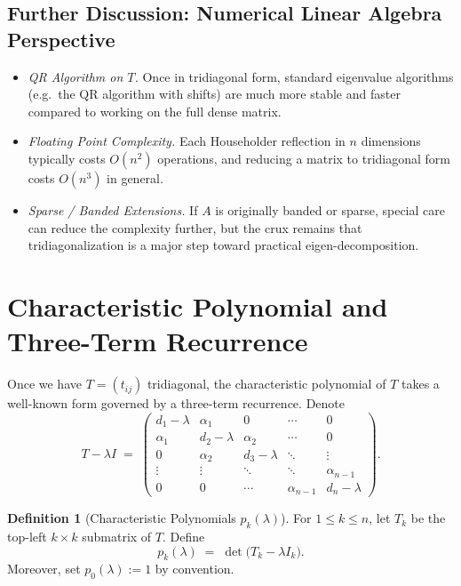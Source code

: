 \documentclass[letterpaper,11pt,oneside,reqno]{article}
\numberwithin{equation}{section}
\theoremstyle{definition}
\newtheorem{definition}[proposition]{Definition}
\begin{document}
\subsection{Further Discussion: Numerical Linear Algebra Perspective}

\begin{itemize}
\item \emph{QR Algorithm on $T$.} Once in tridiagonal form, standard eigenvalue algorithms (e.g.\ the QR algorithm with shifts) are much more stable and faster compared to working on the full dense matrix.
\item \emph{Floating Point Complexity.} Each Householder reflection in $n$ dimensions typically costs $O(n^2)$ operations, and reducing a matrix to tridiagonal form costs $O(n^3)$ in general.
\item \emph{Sparse / Banded Extensions.} If $A$ is originally banded or sparse, special care can reduce the complexity further, but the crux remains that tridiagonalization is a major step toward practical eigen-decomposition.
\end{itemize}

\section{Characteristic Polynomial and Three-Term Recurrence}
\label{sec:3term}

Once we have $T = (t_{ij})$ tridiagonal, the characteristic polynomial of $T$ takes a well-known form governed by a three-term recurrence. Denote
\[
  T - \lambda I \;=\;
  \begin{pmatrix}
    d_1 - \lambda & \alpha_1 & 0 & \cdots & 0 \\
    \alpha_1 & d_2 - \lambda & \alpha_2 & \cdots & 0 \\
    0        & \alpha_2 & d_3 - \lambda & \ddots & \vdots \\
    \vdots   & \vdots   & \ddots & \ddots & \alpha_{n-1} \\
    0        & 0        & \cdots & \alpha_{n-1} & d_n - \lambda
  \end{pmatrix}.
\]

\begin{definition}[Characteristic Polynomials $p_k(\lambda)$]
For $1 \le k \le n$, let $T_k$ be the top-left $k \times k$ submatrix of $T$. Define
\[
  p_k(\lambda) \;=\; \det\bigl(T_k - \lambda I_k\bigr).
\]
Moreover, set $p_0(\lambda):=1$ by convention.
\end{definition}
\end{document}
